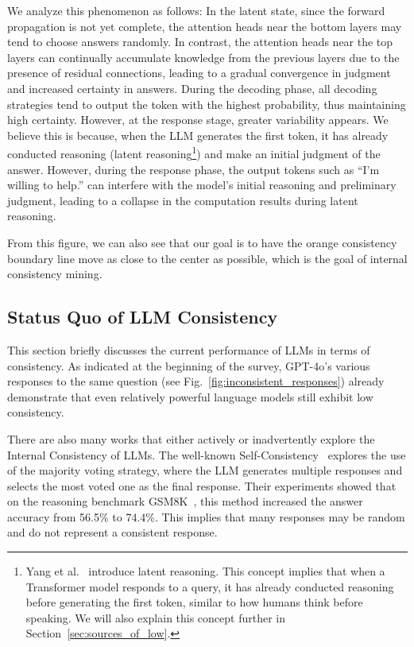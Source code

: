 \documentclass[lettersize,journal]{IEEEtran}
\begin{document}
We analyze this phenomenon as follows: In the latent state, since the forward propagation is not yet complete, the attention heads near the bottom layers may tend to choose answers randomly. In contrast, the attention heads near the top layers can continually accumulate knowledge from the previous layers due to the presence of residual connections, leading to a gradual convergence in judgment and increased certainty in answers. During the decoding phase, all decoding strategies tend to output the token with the highest probability, thus maintaining high certainty. However, at the response stage, greater variability appears. We believe this is because, when the LLM generates the first token, it has already conducted reasoning (latent reasoning\footnote{Yang et al.~\cite{TheoryLatentReason_24_arXiv_Google} introduce latent reasoning. This concept implies that when a Transformer model responds to a query, it has already conducted reasoning before generating the first token, similar to how humans think before speaking. We will also explain this concept further in Section~\ref{sec:sources_of_low}.}) and make an initial judgment of the answer. However, during the response phase, the output tokens such as ``I'm willing to help.'' can interfere with the model's initial reasoning and preliminary judgment, leading to a collapse in the computation results during latent reasoning.

From this figure, we can also see that our goal is to have the orange consistency boundary line move as close to the center as possible, which is the goal of internal consistency mining.


\subsection{Status Quo of LLM Consistency} \label{sec:status_quo}


\noindent This section briefly discusses the current performance of LLMs in terms of consistency. As indicated at the beginning of the survey, GPT-4o's various responses to the same question (see Fig.~\ref{fig:inconsistent_responses}) already demonstrate that even relatively powerful language models still exhibit low consistency.

There are also many works that either actively or inadvertently explore the Internal Consistency of LLMs. The well-known Self-Consistency~\cite{SelfConsistency_23_ICLR_Google} explores the use of the majority voting strategy, where the LLM generates multiple responses and selects the most voted one as the final response. Their experiments showed that on the reasoning benchmark GSM8K~\cite{cobbe2021training}, this method increased the answer accuracy from 56.5\% to 74.4\%. This implies that many responses may be random and do not represent a consistent response.
\end{document}
